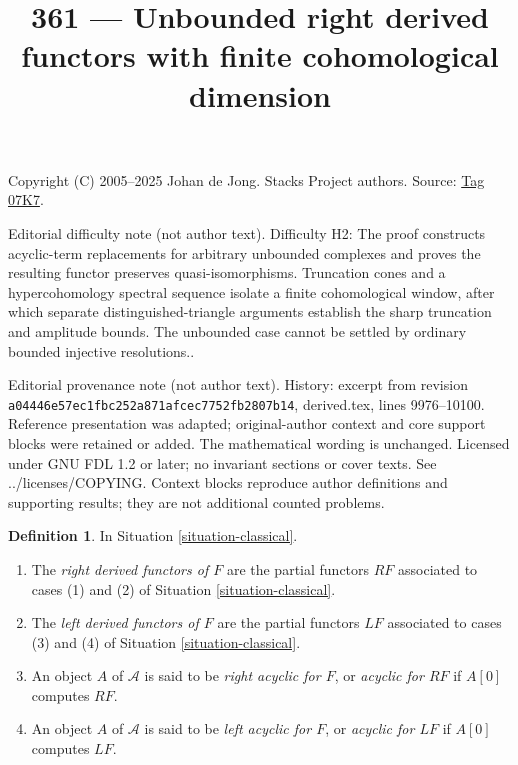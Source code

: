 \documentclass{amsart}
\theoremstyle{plain}
\theoremstyle{definition}
\newtheorem{definition}[subsection]{Definition}
\theoremstyle{remark}
\numberwithin{equation}{subsection}
\begin{document}
\title[Stacks Project, Tag 07K7]{361 --- Unbounded right derived functors with finite cohomological dimension}
\maketitle
\noindent Copyright (C) 2005--2025 Johan de Jong. Stacks Project authors. Source: \href{https://stacks.math.columbia.edu/tag/07K7}{Tag 07K7}.

\noindent Editorial difficulty note (not author text). Difficulty H2: The proof constructs acyclic-term replacements for arbitrary unbounded complexes and proves the resulting functor preserves quasi-isomorphisms. Truncation cones and a hypercohomology spectral sequence isolate a finite cohomological window, after which separate distinguished-triangle arguments establish the sharp truncation and amplitude bounds. The unbounded case cannot be settled by ordinary bounded injective resolutions..

\noindent Editorial provenance note (not author text). History: excerpt from revision \texttt{a0444\allowbreak 6e57e\allowbreak c1fbc\allowbreak 252a8\allowbreak 71afc\allowbreak ec775\allowbreak 2fb28\allowbreak 07b14}, derived.tex, lines 9976--10100. Reference presentation was adapted; original-author context and core support blocks were retained or added. The mathematical wording is unchanged. Licensed under GNU FDL 1.2 or later; no invariant sections or cover texts. See ../licenses/COPYING. Context blocks reproduce author definitions and supporting results; they are not additional counted problems.

\begin{definition}
\label{definition-derived-functor}
In
Situation \ref{situation-classical}.
\begin{enumerate}
\item The {\it right derived functors of $F$} are the partial functors
$RF$ associated to cases (1) and (2) of
Situation \ref{situation-classical}.
\item The {\it left derived functors of $F$} are the partial functors
$LF$ associated to cases (3) and (4) of
Situation \ref{situation-classical}.
\item An object $A$ of $\mathcal{A}$ is said to be
{\it right acyclic for $F$}, or {\it acyclic for $RF$}
if $A[0]$ computes $RF$.
\item An object $A$ of $\mathcal{A}$ is said to be
{\it left acyclic for $F$}, or {\it acyclic for $LF$}
if $A[0]$ computes $LF$.
\end{enumerate}
\end{definition}
\end{document}
